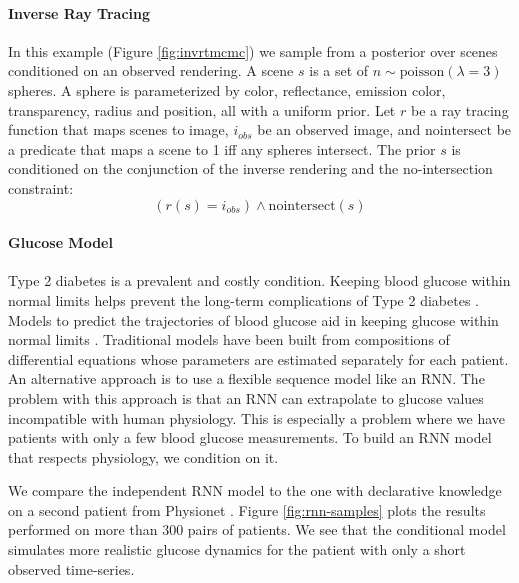 \paragraph{Inverse Ray Tracing}
In this example (Figure \ref{fig:invrtmcmc}) we sample from a posterior over scenes conditioned on an observed rendering.  A scene $s$ is a set of $n \sim \textrm{poisson}(\lambda = 3)$ spheres.
A sphere is parameterized by color, reflectance, emission color, transparency, radius and position, all with a uniform prior.
Let $r$ be a ray tracing function that maps scenes to image, $i_{obs}$ be an observed image, and $\textrm{nointersect}$ be a predicate that maps a scene to 1 iff any spheres intersect.
The prior $s$ is conditioned on the conjunction of the inverse rendering and the no-intersection constraint:
\begin{equation}
(r(s) = i_{obs}) \land \textrm{nointersect}(s)
\end{equation}



\paragraph{Glucose Model}
Type 2 diabetes is a prevalent and costly condition.
Keeping blood glucose within normal limits helps prevent the
long-term complications of Type 2 diabetes \citep{brownlee2006glycemic}. Models to predict the trajectories of blood glucose aid in keeping glucose within
normal limits \citep{zeevi2015personalized}. Traditional models have been built from compositions of differential equations \citep{albers2017personalized,levine2017offline} whose parameters are estimated separately for each patient. An alternative approach is to use a flexible sequence model like an RNN. The problem with this approach is that an RNN can extrapolate to glucose values incompatible with human physiology. This is especially a problem where we have patients with only a few blood glucose measurements. To build an RNN model that respects physiology, we condition on it.

We compare the independent RNN model to the one with declarative knowledge on a second patient from Physionet \citep{moody2001physionet}.
Figure \ref{fig:rnn-samples} plots the results performed on more than 300 pairs of patients.
We see that the conditional model simulates
more realistic glucose dynamics for the patient 
with only a short observed time-series.


